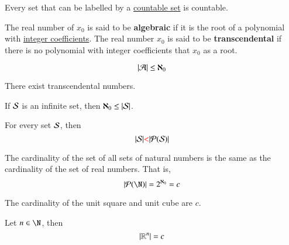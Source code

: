 \documentclass[11pt]{article}
\begin{document}
		\begin{theorem}
		    Every set that can be labelled by a \ul{countable set} is countable.
		\end{theorem}
		
		\begin{definition}[10.3.19]
		    The real number of $x_0$ is said to be \textbf{algebraic} if it is the root of a polynomial with \ul{integer coefficients}. The real number $x_0$ is said to be \textbf{transcendental} if there is no polynomial with integer coefficients that $x_0$ as a root.
		\end{definition}
		
		\begin{theorem}[Theorem 10.3.20]
		    \[
		        |\mathcal{{A}}| \leq \aleph_0
		    \]
		\end{theorem}
		
		\begin{corollary}[10.3.21]
		    There exist transcendental numbers.
		\end{corollary}
		
		\begin{theorem}[10.3.24]
		    If $\mathcal{{S}}$ is an infinite set, then $\aleph_0 \leq |\mathcal{{S}}|$.
		\end{theorem}
		
		\begin{theorem}[10.3.27]
		    For every set $\mathcal{{S}}$, then 
		    \[
		        |\mathcal{{S}}| \textcolor{red}{<} |\mathcal{{P}}(\mathcal{{S}})|
		    \]
		\end{theorem}

        \begin{theorem}[10.3.28]
            The cardinality of the set of all sets of natural numbers is the same as the cardinality of the set of real numbers. That is,
            \[
                |\mc{P}(\N)| = 2^{\aleph_0} = c
            \]
        \end{theorem}
        
        \begin{theorem}
            The cardinality of the unit square and unit cube are $c$.
        \end{theorem}
        
        \begin{theorem}[Generalized 10.3.30]
            Let $n \in \N$, then 
            \[
                |\mathbb{R}^n| = c
            \]
        \end{theorem}
        
\end{document}
